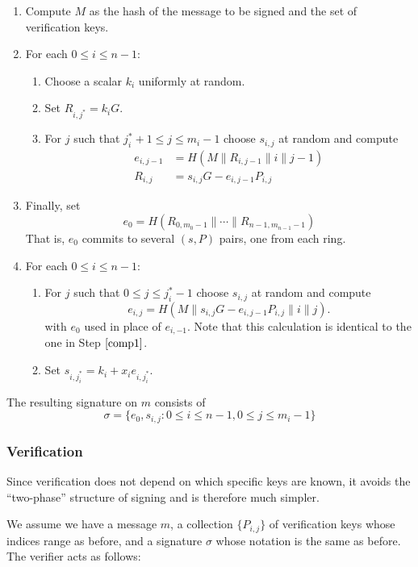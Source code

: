 \documentclass[letterpaper]{article}
\begin{document}
\begin{enumerate}
\item Compute $M$ as the hash of the message to be signed and the set of
verification keys.
\item For each $0\leq i\leq n-1$:
\begin{enumerate}
\item Choose a scalar $k_i$ uniformly at random.
\item Set $R_{i,j^*} = k_iG$.
\item For $j$ such that $j^*_i+1\leq j\leq m_i - 1$ choose $s_{i,j}$ at random and
compute\label{comp1}
\begin{align*}
e_{i,j-1} &= H(M\| R_{i,j-1} \| i \| j - 1)	\\
R_{i,j} &= s_{i,j}G - e_{i,j-1}P_{i,j}
\end{align*}
\end{enumerate}
\item Finally, set
\[ e_0 = H(R_{0,m_0-1} \| \cdots \| R_{n-1,m_{n-1}-1}) \]
That is, $e_0$ commits to several $(s, P)$ pairs, one from each ring.
\item For each $0\leq i\leq n-1$:
\begin{enumerate}
\item For $j$ such that $0\leq j\leq j^*_i - 1$ choose $s_{i,j}$ at random and
compute
\[ e_{i,j} = H(M\| s_{i,j}G - e_{i,j-1}P_{i,j}\|i\|j). \]
with $e_0$ used in place of $e_{i,-1}$. Note that this calculation is identical to
the one in Step $\ref{comp1}$.
\item Set $s_{i,j^*_i} = k_i + x_ie_{i,j^*_i}$.
\end{enumerate}
\end{enumerate}

The resulting signature on $m$ consists of
\[ \sigma = \{ e_0, s_{i, j} : 0\leq i\leq n-1, 0\leq j\leq m_i - 1 \} \]

\subsubsection{Verification}

Since verification does not depend on which specific keys are known, it
avoids the ``two-phase'' structure of signing and is therefore much
simpler.

We assume we have a message $m$, a collection $\{ P_{i,j} \}$ of verification
keys whose indices range as before, and a signature $\sigma$ whose notation
is the same as before. The verifier acts as follows:
\end{document}

